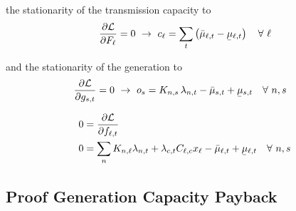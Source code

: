 \documentclass[11pt,twocolumn]{article}
\newcommand{\ubar}[1]{\underaccent{\bar}{#1}}
\newcommand{\Forall}[1]{\hspace{10pt} \forall \,\, #1 }
\newcommand{\pdv}[2]{\frac{\partial #1}{\partial #2}}
\newcommand{\generation}{g_{s,t}}
\newcommand{\capacityFlow}{F_{\ell}}
\newcommand{\capexFlow}{c_{\ell}}
\newcommand{\opexGeneration}{o_{s}}
\newcommand{\incidence}[1][n]{K_{#1,\ell}}
\newcommand{\incidenceGenerators}[1][n]{K_{#1,s}}
\newcommand{\mulowergeneration}{\ubar{\mu}_{s,t}}
\newcommand{\muuppergeneration}{\bar{\mu}_{s,t}}
\newcommand{\mulowerflow}{\ubar{\mu}_{\ell,t}}
\newcommand{\muupperflow}{\bar{\mu}_{\ell,t}}
\newcommand{\lmp}[1][n]{\lambda_{#1,t}}
\newcommand{\flow}{f_{\ell,t}}
\newcommand{\cycle}{C_{\ell,c}}
\newcommand{\impedance}{x_\ell}
\newcommand{\cycleprice}{\lambda_{c,t}}
\newcommand{\lagrangian}{\mathcal{L}}
\begin{document}
the stationarity of the transmission capacity to
\begin{align}
\pdv{\lagrangian}{\capacityFlow} = 0 \,\, \rightarrow \,\, 
\capexFlow =  \sum_t \left( \muupperflow - \mulowerflow \right) \Forall{\ell}
\label{eq:capexFlow_duality}
\end{align}


and the stationarity of the generation to 
\begin{align}
\pdv{\lagrangian}{\generation} &= 0 \,\, \rightarrow \,\,  
\opexGeneration =  \incidenceGenerators \, \lmp - \muuppergeneration + \mulowergeneration \Forall{n,s} \label{eq:opex_duality}
\end{align}

\begin{align}
0 &= \pdv{\lagrangian}{\flow}  \\ 
0 &= \sum_n \incidence \lmp  + \cycleprice \cycle \impedance  - \muupperflow + \mulowerflow \Forall{n,s} \label{eq:opex_flow_duality}
\end{align}



\subsection{Proof Generation Capacity Payback}
\end{document}
